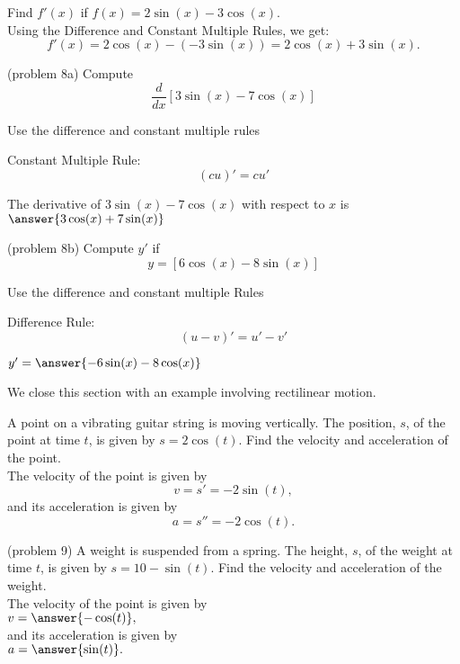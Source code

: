 \documentclass[handout]{ximera}
\begin{document}
\begin{example}[example 8]
 Find $f'(x)$ if  $f(x) = 2\sin(x) - 3\cos(x).$\\
 Using the Difference and Constant Multiple Rules, we get:
 \[
 f'(x) = 2\cos(x) - (-3\sin(x)) = 2\cos(x) + 3\sin(x).
 \]
\end{example}


\begin{problem}(problem 8a)
  Compute 
  \[
  \frac{d}{dx} \left[3\sin(x) - 7\cos(x)\right]
  \]
  
		\begin{hint}
      Use the difference and constant multiple rules
    \end{hint}
    \begin{hint}
      Constant Multiple Rule:
      \[
      (cu)' = cu'
      \]
    \end{hint}    
		The derivative of $3\sin(x) - 7\cos(x)$ with respect to $x$ is
		 $\answer{3\cos(x) + 7\sin(x)}$
	
\end{problem}

\begin{problem}(problem 8b)
  Compute $y'$ if
  \[
  y= \left[6\cos(x) - 8\sin(x)\right]
  \]
  
		\begin{hint}
      Use the difference and constant multiple Rules
    \end{hint}
    \begin{hint}
      Difference Rule:
      \[
      (u-v)' = u' - v'
      \]
    \end{hint}    
		
  $y' = \answer{-6\sin(x) - 8\cos(x)}$
	
\end{problem}

We close this section with an example involving rectilinear motion.

\begin{example}
A point on a vibrating guitar string is moving vertically.
The position, $s$, of the point at time $t$, is given by $s = 2\cos(t)$.  Find the velocity and acceleration of the point.\\
The velocity of the point is given by 
\[
v = s' = -2\sin(t),
\]
and its acceleration is given by 
\[
a = s'' = -2\cos(t).
\]

\end{example}

\begin{problem}(problem 9)
A weight is suspended from a spring.
The height, $s$, of the weight at time $t$, is given by $s = 10-\sin(t)$.  Find the velocity and acceleration of the weight.\\
The velocity of the point is given by\\
 $v = \answer{ -\cos(t)},$ \\
and its acceleration is given by\\
 $a = \answer{\sin(t)}.$
\end{problem}
\end{document}
